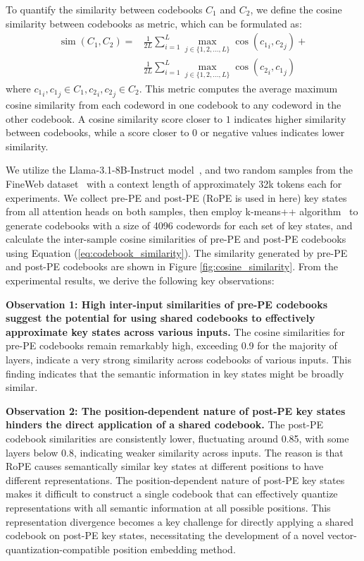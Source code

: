 To quantify the similarity between codebooks \(C_1\) and \(C_2\), we define the cosine similarity between codebooks as metric, which can be formulated as:
\begin{equation}
    \label{eq:codebook_similarity}
    \begin{aligned}
        \operatorname*{sim}(C_1, C_2) = & \frac 1 {2L} \sum_{i=1}^L \max_{j \in \{1, 2, \dots, L\}} \cos ({c_1}_i, {c_2}_j) + \\
        & \frac 1 {2L}  \sum_{i=1}^L \max_{j \in \{1, 2, \dots, L\}} \cos ({c_2}_i, {c_1}_j)
    \end{aligned}
\end{equation}
where \({c_1}_i,{c_1}_j \in C_1, {c_2}_i,{c_2}_j \in C_2\).
This metric computes the average maximum cosine similarity from each codeword in one codebook to any codeword in the other codebook.
A cosine similarity score closer to $1$ indicates higher similarity between codebooks, while a score closer to $0$ or negative values indicates lower similarity.

We utilize the Llama-3.1-8B-Instruct model~\citep{llama-3}, and two random samples from the FineWeb dataset~\citep{fineweb} with a context length of approximately 32k tokens each for experiments.
We collect pre-PE and post-PE (RoPE is used in here) key states from all attention heads on both samples, then employ k-means++ algorithm~\citep{kmeans++} to generate codebooks with a size of 4096 codewords for each set of key states, and calculate the inter-sample cosine similarities of pre-PE and post-PE codebooks using Equation (\ref{eq:codebook_similarity}). 
The similarity generated by pre-PE and post-PE codebooks are shown in  Figure \ref{fig:cosine_similarity}.
From the experimental results, we derive the following key observations:

\noindent
\textbf{
    Observation 1: High inter-input similarities of pre-PE codebooks suggest the potential for using shared codebooks to effectively approximate key states across various inputs.
} 
The cosine similarities for pre-PE codebooks remain remarkably high, exceeding 0.9 for the majority of layers, indicate a very strong similarity across codebooks of various inputs. 
This finding indicates that the semantic information in key states might be broadly similar.

\noindent
\textbf{
    Observation 2: The position-dependent nature of post-PE key states hinders the direct application of a shared codebook.
} 
The post-PE codebook similarities are consistently lower, fluctuating around 0.85, with some layers below 0.8, indicating weaker similarity across inputs. 
The reason is that RoPE causes semantically similar key states at different positions to have different representations.
The position-dependent nature of post-PE key states makes it difficult to construct a single codebook that can effectively quantize representations with all semantic information at all possible positions.
This representation divergence becomes a key challenge for directly applying a shared codebook on post-PE key states, necessitating the development of a novel vector-quantization-compatible position embedding method.

